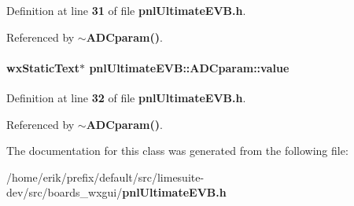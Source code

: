 Definition at line {\bf 31} of file {\bf pnl\+Ultimate\+E\+V\+B.\+h}.



Referenced by {\bf $\sim$\+A\+D\+Cparam()}.

\paragraph[{value}]{\setlength{\rightskip}{0pt plus 5cm}wx\+Static\+Text$\ast$ pnl\+Ultimate\+E\+V\+B\+::\+A\+D\+Cparam\+::value}\label{classpnlUltimateEVB_1_1ADCparam_a81196f2b7e28da42cc6406dc7b04c30a}


Definition at line {\bf 32} of file {\bf pnl\+Ultimate\+E\+V\+B.\+h}.



Referenced by {\bf $\sim$\+A\+D\+Cparam()}.



The documentation for this class was generated from the following file\+:\begin{DoxyCompactItemize}
\item 
/home/erik/prefix/default/src/limesuite-\/dev/src/boards\+\_\+wxgui/{\bf pnl\+Ultimate\+E\+V\+B.\+h}\end{DoxyCompactItemize}
